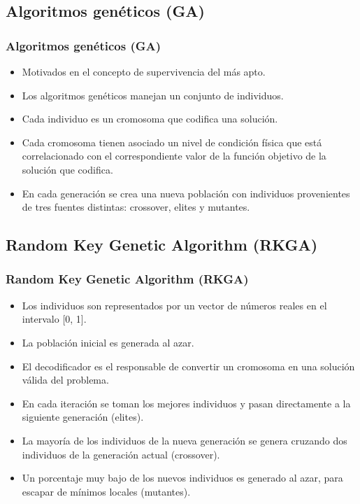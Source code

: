 \documentclass{beamer}
\begin{document}

\subsection{Algoritmos genéticos (GA)}

\begin{frame}
\frametitle{Algoritmos genéticos (GA)}

\begin{itemize}
    \item Motivados en el concepto de supervivencia del más apto.
    \pause
    \item Los algoritmos genéticos manejan un conjunto de individuos.
    \pause
    \item Cada individuo es un cromosoma que codifica una solución.
    \pause
    \item Cada cromosoma tienen asociado un nivel de condición física que está correlacionado con el correspondiente valor de la función objetivo de la solución que codifica.
    \pause
    \item En cada generación se crea una nueva población con individuos provenientes de tres fuentes distintas: crossover, elites y mutantes.
\end{itemize}

\end{frame}


\subsection{Random Key Genetic Algorithm (RKGA)}

\begin{frame}
\frametitle{Random Key Genetic Algorithm (RKGA)}

\begin{itemize}
    \item Los individuos son representados por un vector de números reales en el intervalo [0, 1].
    \pause
    \item La población inicial es generada al azar.
    \pause
    \item El decodificador es el responsable de convertir un cromosoma en una solución válida del problema.
    \pause
    \item En cada iteración se toman los mejores individuos y pasan directamente a la siguiente generación (elites).
    \pause
    \item La mayoría de los individuos de la nueva generación se genera cruzando dos individuos de la generación actual (crossover).
    \pause
    \item Un porcentaje muy bajo de los nuevos individuos es generado al azar, para escapar de mínimos locales (mutantes).
\end{itemize}

\end{frame}
\end{document}
